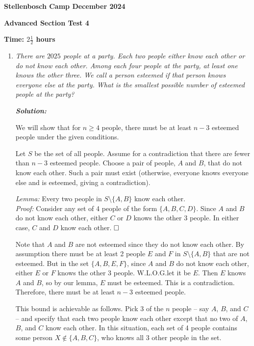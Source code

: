 \documentclass[12pt]{article}
\newcommand{\sol}{\textbf{\textit{Solution: }}}
\begin{document}
\begin{center} \large
\textbf{Stellenbosch Camp December 2024}

\textbf{Advanced Section Test 4}

\textbf{Time: \(2 \frac{1}{2}\) hours}
\end{center}

\begin{enumerate}
\item \textit{There are \(2025\) people at a party. Each two people either know each other or do not know each other. Among each four people at the party, at least one knows the other three. We call a person \emph{esteemed} if that person knows everyone else at the party. What is the smallest possible number of esteemed people at the party?}

\sol

We will show that for $n \geqslant 4$ people, there must be at least $n-3$ esteemed people under the given conditions.

Let $S$ be the set of all people. Assume for a contradiction that there are fewer than $n-3$ esteemed people. Choose a pair of people, $A$ and $B$, that do not know each other. Such a pair must exist (otherwise, everyone knows everyone else and is esteemed, giving a contradiction).

\textit{Lemma:} Every two people in $S \setminus \{A, B\}$ know each other.\\
\textit{Proof:} Consider any set of 4 people of the form $\{ A,B,C,D \}$. Since $A$ and $B$ do not know each other, either $C$ or $D$ knows the other 3 people. In either case, $C$ and $D$ know each other. $\hfill\square$

Note that $A$ and $B$ are not esteemed since they do not know each other. By assumption there must be at least 2 people $E$ and $F$ in $S \setminus \{A, B\}$ that are not esteemed. But in the set $\{A,B,E,F\}$, since $A$ and $B$ do not know each other, either $E$ or $F$ knows the other 3 people. W.L.O.G.\@ let it be $E$. Then $E$ knows $A$ and $B$, so by our lemma, $E$ must be esteemed. This is a contradiction. Therefore, there must be at least $n-3$ esteemed people.

This bound is achievable as follows. Pick 3 of the $n$ people -- say $A$, $B$, and $C$ -- and specify that each two people know each other except that no two of $A$, $B$, and $C$ know each other. In this situation, each set of 4 people contains some person $X \notin \{A,B,C\}$, who knows all 3 other people in the set.


\end{enumerate}
\end{document}
